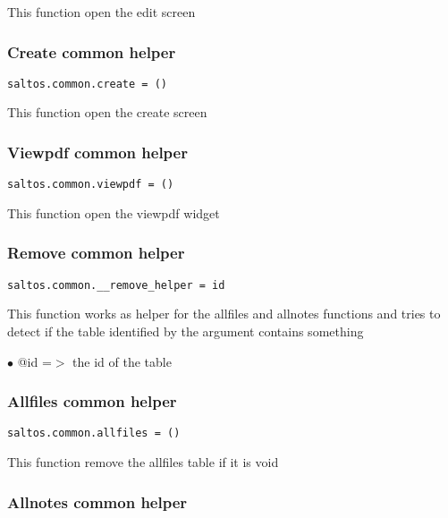 \documentclass[a4paper]{article}
\begin{document}
This function open the edit screen

\hypertarget{toc685}{}
\subsubsection{Create common helper}

\begin{lstlisting}
saltos.common.create = ()
\end{lstlisting}

This function open the create screen

\hypertarget{toc686}{}
\subsubsection{Viewpdf common helper}

\begin{lstlisting}
saltos.common.viewpdf = ()
\end{lstlisting}

This function open the viewpdf widget

\hypertarget{toc687}{}
\subsubsection{Remove common helper}

\begin{lstlisting}
saltos.common.__remove_helper = id
\end{lstlisting}

This function works as helper for the allfiles and allnotes functions and
tries to detect if the table identified by the argument contains something

\begin{compactitem}
\item[\color{myblue}$\bullet$] @id =$>$ the id of the table
\end{compactitem}

\hypertarget{toc688}{}
\subsubsection{Allfiles common helper}

\begin{lstlisting}
saltos.common.allfiles = ()
\end{lstlisting}

This function remove the allfiles table if it is void

\hypertarget{toc689}{}
\subsubsection{Allnotes common helper}
\end{document}
